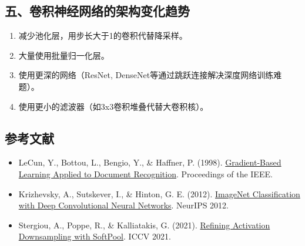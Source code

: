 \hypertarget{ux4e94ux5377ux79efux795eux7ecfux7f51ux7edcux7684ux67b6ux6784ux53d8ux5316ux8d8bux52bf}{%
\subsection{五、卷积神经网络的架构变化趋势}\label{ux4e94ux5377ux79efux795eux7ecfux7f51ux7edcux7684ux67b6ux6784ux53d8ux5316ux8d8bux52bf}}

\begin{enumerate}
\def\labelenumi{\arabic{enumi}.}
\item
  减少池化层，用步长大于1的卷积代替降采样。
\item
  大量使用批量归一化层。
\item
  使用更深的网络（ResNet, DenseNet等通过跳跃连接解决深度网络训练难题）。
\item
  使用更小的滤波器（如3x3卷积堆叠代替大卷积核）。
\end{enumerate}

\FloatBarrier
{}
\hypertarget{ux53c2ux8003ux6587ux732e-11}{%
\subsection{参考文献}\label{ux53c2ux8003ux6587ux732e-11}}

\vspace{0.25em}
\begin{itemize}
\tightlist
\item
  LeCun, Y., Bottou, L., Bengio, Y., \& Haffner, P. (1998). \href{http://yann.lecun.com/exdb/publis/pdf/lecun-98.pdf}{Gradient-Based Learning Applied to Document Recognition}. Proceedings of the IEEE.
\item
  Krizhevsky, A., Sutskever, I., \& Hinton, G. E. (2012). \href{https://papers.nips.cc/paper/4824-imagenet-classification-with-deep-convolutional-neural-networks}{ImageNet Classification with Deep Convolutional Neural Networks}. NeurIPS 2012.
\item
  Stergiou, A., Poppe, R., \& Kalliatakis, G. (2021). \href{https://arxiv.org/abs/2101.00440}{Refining Activation Downsampling with SoftPool}. ICCV 2021.
\end{itemize}

\clearpage
